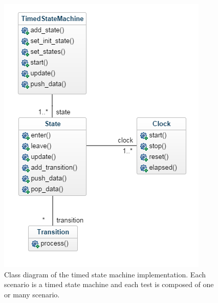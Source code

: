\documentclass[12pt]{article}
\begin{document}
\begin{figure}
    \centering
    \includegraphics[scale=0.8]{class_diagram.png}
    \caption{Class diagram of the timed state machine implementation. Each scenario is a timed state machine and each test is composed of one or many scenario.}
    \label{class_diagram}
\end{figure}
\end{document}
